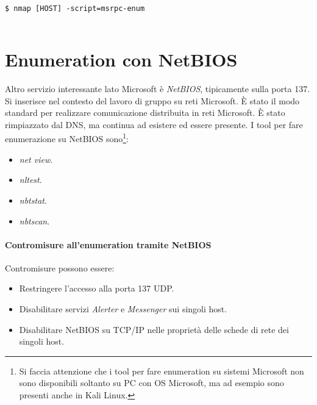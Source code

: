 \documentclass[14pt]{extreport}
\begin{document}
\vspace{5pt}

{
\small
\begin{tcolorbox}

\begin{verbatim}

$ nmap [HOST] -script=msrpc-enum
  
\end{verbatim}

\end{tcolorbox}
}

\vspace{5pt}



\section{Enumeration con NetBIOS}

Altro servizio interessante lato Microsoft è \textit{NetBIOS}, tipicamente sulla porta 137. Si inserisce nel contesto del lavoro di gruppo su reti Microsoft. È stato il modo standard per realizzare comunicazione distribuita in reti Microsoft. È stato rimpiazzato dal DNS, ma continua ad esistere ed essere presente. I tool per fare enumerazione su NetBIOS sono\footnote{Si faccia attenzione che i tool per fare enumeration su sistemi Microsoft non sono disponibili soltanto su PC con OS Microsoft, ma ad esempio sono presenti anche in Kali Linux.}:


\begin{itemize}
    \item \textit{net view}.
    
    \item \textit{nltest}.
    
    \item \textit{nbtstat}.
    
    \item \textit{nbtscan}.
\end{itemize}


\paragraph{Contromisure all'enumeration tramite NetBIOS}

Contromisure possono essere:

\begin{itemize}
    \item Restringere l'accesso alla porta 137 UDP.
    
    \item Disabilitare servizi \textit{Alerter} e \textit{Messenger} sui singoli host.
    
    \item Disabilitare NetBIOS su TCP/IP nelle proprietà delle schede di rete dei singoli host.
\end{itemize}
\end{document}

